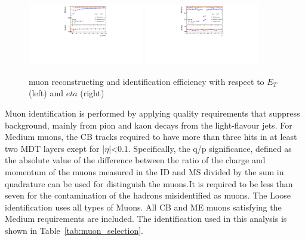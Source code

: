 \begin{figure}[tbp]
\begin{center}
 \includegraphics[width=0.45\textwidth,keepaspectratio]{figures/Reconstruction/recoMuonpT}
 \includegraphics[width=0.45\textwidth,keepaspectratio]{figures/Reconstruction/recoMuonEta}
\caption{
muon reconstructing and identification efficiency with respect to $E_T$ (left) and $eta$ (right) \cite{MUON-2018-03}
}
\label{fig:recoMuon}
\end{center}
\end{figure}
Muon identification is performed by applying quality requirements that suppress background, mainly from pion and kaon decays from the light-flavour jets. 
For Medium muons, the CB tracks required to have more than three hits in at least two MDT layers exept for |$\eta$|<0.1.
Specifically, the q/p significance, defined as the absolute value of the difference between the ratio of the charge and momentum of the muons measured in the ID and MS divided by the sum in quadrature can be used for distinguish the muons.It is required to be less than seven for the contamination of the hadrons misidentified as muons.
The Loose identification uses all types of Muons. All CB and ME muons satisfying the Medium requirements are included. 
The identification used in this analysis is shown in Table~\ref{tab:muon_selection}.
